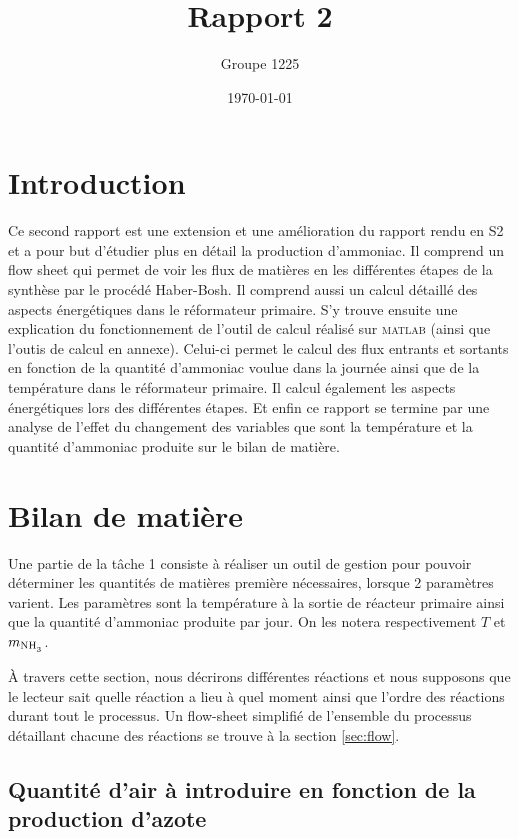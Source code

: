 \documentclass[a4paper, oneside, 12pt]{article}
\title{Rapport 2}
\author{Groupe 1225}
\date{\today}
\begin{document}
\maketitle

\section{Introduction}

Ce second rapport est une extension et une amélioration du rapport rendu 
en S2 et a pour but d'étudier plus en détail la production d'ammoniac. 
Il comprend un flow sheet qui permet de voir les flux de matières en 
les différentes étapes de la synthèse par le procédé Haber-Bosh. 
Il comprend aussi un calcul détaillé des aspects énergétiques dans le réformateur primaire.
S’y trouve ensuite une explication du fonctionnement de l’outil de calcul
réalisé sur \textsc{matlab} (ainsi que l'outis de calcul en annexe).
Celui-ci permet le calcul des flux entrants et sortants en fonction 
de la quantité d'ammoniac voulue dans la journée ainsi que de la 
température dans le réformateur primaire. Il calcul également les aspects énergétiques 
lors des différentes étapes. 
Et enfin ce rapport se termine par une analyse de l'effet du changement 
des variables que sont la température et la quantité d'ammoniac produite 
sur le bilan de matière.

\section{Bilan de matière}

Une partie de la t\^ache 1 consiste à réaliser un outil de gestion
pour pouvoir déterminer les quantités de matières première nécessaires,
lorsque 2 paramètres varient. 
Les paramètres sont la température à la sortie de réacteur primaire ainsi
que la quantité d'ammoniac produite par jour. 
On les notera respectivement $T$ et $m_{\ce{NH3}}$.

À travers cette section, nous décrirons différentes réactions et nous 
supposons que le lecteur sait quelle réaction a lieu à quel moment ainsi 
que l'ordre des réactions durant tout le processus.
Un flow-sheet simplifié de l'ensemble du processus détaillant chacune
des réactions se trouve à la section \ref{sec:flow}.

\subsection{Quantité d'air à introduire en fonction de la production d'azote}
\end{document}
